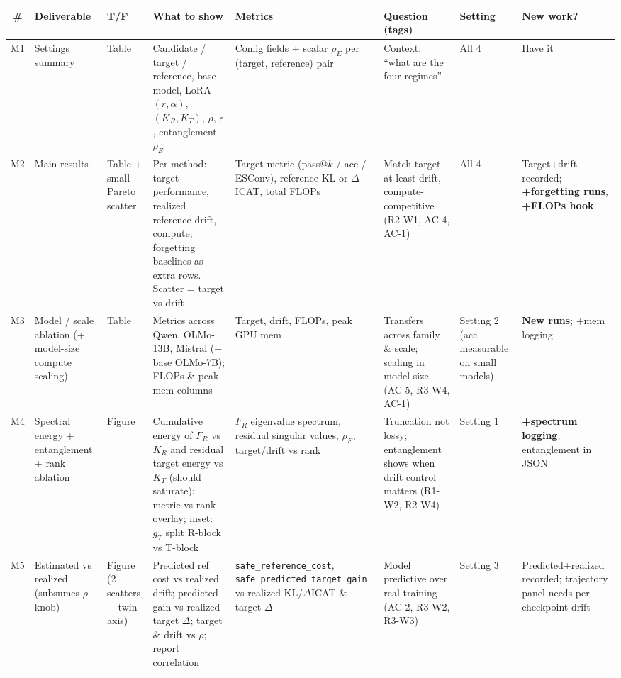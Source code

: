\documentclass{article}
\begin{document}
\footnotesize
\begin{tabular}{@{}cP{1.05in}P{0.45in}P{2.0in}P{1.5in}P{1.5in}P{0.7in}P{1.2in}@{}}
\toprule
\# & \textbf{Deliverable} & \textbf{T/F} & \textbf{What to show} & \textbf{Metrics} & \textbf{Question (tags)} & \textbf{Setting} & \textbf{New work?} \\
\midrule

M1 & Settings summary & Table &
Candidate / target / reference, base model, LoRA $(r,\alpha)$, $(K_R,K_T)$, $\rho$, $\epsilon$, entanglement $\rho_E$ &
Config fields + scalar $\rho_E$ per (target, reference) pair &
Context: ``what are the four regimes'' &
All 4 &
Have it \\

M2 & Main results & Table + small Pareto scatter &
Per method: target performance, realized reference drift, compute; forgetting baselines as extra rows. Scatter = target vs drift &
Target metric (pass@$k$ / acc / ESConv), reference KL or $\Delta$ICAT, total FLOPs &
Match target at least drift, compute-competitive (R2-W1, AC-4, AC-1) &
All 4 &
Target+drift recorded; \textbf{+forgetting runs}, \textbf{+FLOPs hook} \\

M3 & Model / scale ablation (+ model-size compute scaling) & Table &
Metrics across Qwen, OLMo-13B, Mistral (+ base OLMo-7B); FLOPs \& peak-mem columns &
Target, drift, FLOPs, peak GPU mem &
Transfers across family \& scale; scaling in model size (AC-5, R3-W4, AC-1) &
Setting 2 (acc measurable on small models) &
\textbf{New runs}; +mem logging \\

M4 & Spectral energy + entanglement + rank ablation & Figure &
Cumulative energy of $F_R$ vs $K_R$ and residual target energy vs $K_T$ (should saturate); metric-vs-rank overlay; inset: $g_T$ split R-block vs T-block &
$F_R$ eigenvalue spectrum, residual singular values, $\rho_E$, target/drift vs rank &
Truncation not lossy; entanglement shows when drift control matters (R1-W2, R2-W4) &
Setting 1 &
\textbf{+spectrum logging}; entanglement in JSON \\

M5 & Estimated vs realized (subsumes $\rho$ knob) & Figure (2 scatters + twin-axis) &
Predicted ref cost vs realized drift; predicted gain vs realized target $\Delta$; target \& drift vs $\rho$; report correlation &
\texttt{safe\_reference\_cost}, \texttt{safe\_predicted\_target\_gain} vs realized KL/$\Delta$ICAT \& target $\Delta$ &
Model predictive over real training (AC-2, R3-W2, R3-W3) &
Setting 3 &
Predicted+realized recorded; trajectory panel needs per-checkpoint drift \\

\bottomrule
\end{tabular}
\end{document}
